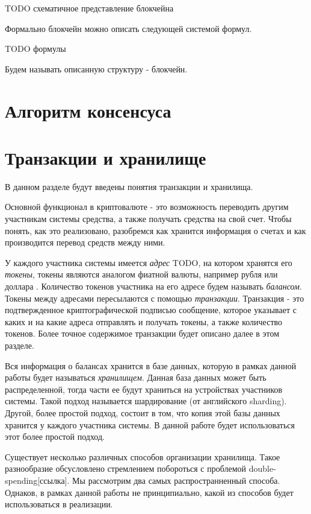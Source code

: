 TODO схематичное представление блокчейна

Формально блокчейн можно описать следующей системой формул.

TODO формулы

Будем называть описанную структуру - блокчейн.

\section{Алгоритм консенсуса}

\section{Транзакции и хранилище}
В данном разделе будут введены понятия транзакции и хранилища. 

Основной функционал в криптовалюте - это возможность переводить другим участникам системы средства, а также получать средства на свой счет.
Чтобы понять, как это реализовано, разобремся как хранится информация о счетах и как производится перевод средств между ними.

У каждого участника системы имеется \textit{адрес} TODO, на котором хранятся его \textit{токены}, токены
являются аналогом фиатной валюты, например рубля или доллара . Количество токенов участника на его адресе будем называть \textit{балансом}. Токены между адресами пересылаются с помощью \textit{транзакции}. Транзакция - это подтвержденное криптографической подписью сообщение, которое указывает с каких и на какие адреса отправлять и получать токены, а также количество токенов. Более точное содержимое транзакции будет описано далее в этом разделе.

Вся информация о балансах хранится в базе данных, которую в рамках данной работы будет называться \textit{хранилищем}.
Данная база данных может быть распределенной, тогда части ее будут храниться на устройствах участников системы. 
Такой подход называется шардирование (от английского sharding). 
Другой, более простой подход, состоит в том, что копия этой базы данных хранится у каждого участника системы.
В данной работе будет использоваться этот более простой подход.

Существует несколько различных способов организации хранилища.
Такое разнообразие обсусловлено стремлением побороться  с проблемой double-spending[ссылка].
Мы рассмотрим два самых распространненный способа. 
Однаков, в рамках данной работы не принципиально, какой из способов будет использоваться в реализации.

